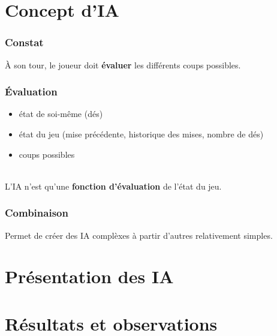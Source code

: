 \documentclass{beamer}
\begin{document}
\section{Concept d'IA}

\begin{frame}
  \frametitle{Constat}

  \begin{large}
    À son tour, le joueur doit \textbf{évaluer} les différents coups possibles.
    \\[1.5cm]
    \begin{center}
    \end{center}
  \end{large}
\end{frame}

\begin{frame}
  \frametitle{Évaluation}

  \begin{itemize}
    \item état de soi-même (dés)
    \item état du jeu (mise précédente, historique des mises, nombre de dés)
    \item coups possibles
  \end{itemize}

  \\[1cm]
  \large L'IA n'est qu'une \textbf{fonction d'évaluation} de l'état du jeu.
\end{frame}

\begin{frame}
  \frametitle{Combinaison}

  \begin{large}
    Permet de créer des IA complèxes à partir d'autres relativement simples.
    \\[1cm]
  \end{large}
\end{frame}

\section{Présentation des IA}

\section{Résultats et observations}
\end{document}
